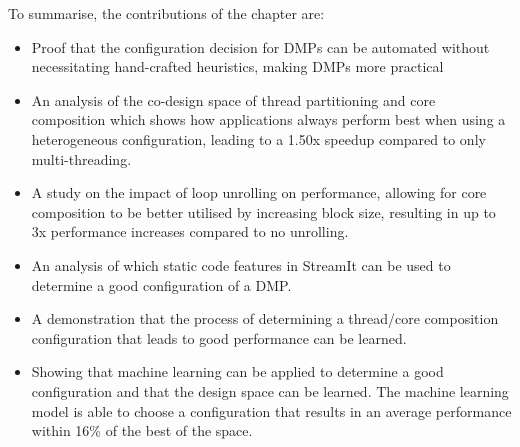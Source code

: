 To summarise, the contributions of the chapter are:
\vspace{-0.5em}
\begin{itemize}
\item Proof that the configuration decision for DMPs can be automated without necessitating hand-crafted heuristics, making DMPs more practical
\vspace{-0.5em}
\item An analysis of the co-design space of thread partitioning and core composition which shows how applications always perform best when using a heterogeneous configuration, leading to a 1.50x speedup compared to only multi-threading.
\vspace{-0.5em}
\item A study on the impact of loop unrolling on performance, allowing for core composition to be better utilised by increasing block size, resulting in up to 3x performance increases compared to no unrolling.
\vspace{-0.5em}
\item An analysis of which static code features in StreamIt can be used to determine a good configuration of a DMP.
\vspace{-0.5em}
\item A demonstration that the process of determining a thread/core composition configuration that leads to good performance can be learned.
\vspace{-0.5em}
\item Showing that machine learning can be applied to determine a good configuration and that the design space can be learned. The machine learning model is able to choose a configuration that results in an average performance within 16\% of the best of the space.
\end{itemize}
